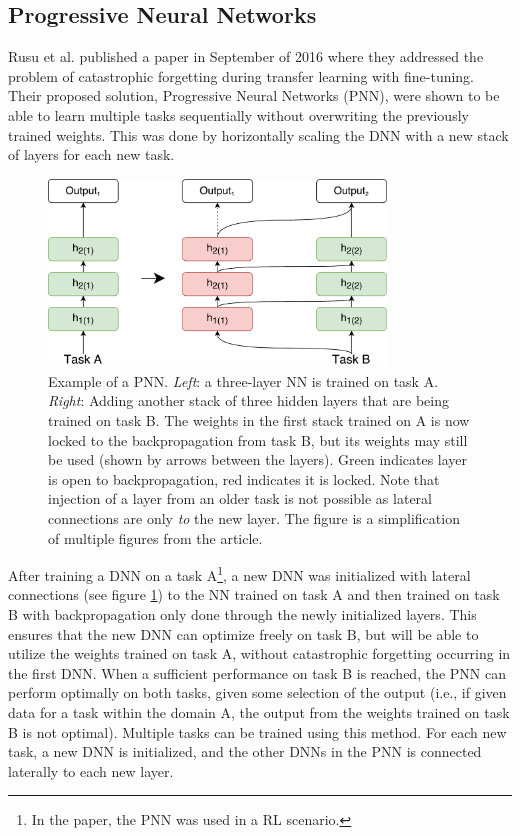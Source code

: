 \subsection{Progressive Neural Networks}
Rusu et al. published a paper in September of 2016\cite{progressiveneuralnetworks} where they addressed the problem of catastrophic forgetting during transfer learning with fine-tuning. Their proposed solution, Progressive Neural Networks (PNN), were shown to be able to learn multiple tasks sequentially without overwriting the previously trained weights. This was done by horizontally scaling the DNN with a new stack of layers for each new task.
\begin{figure}[ht]
    \centering
    \includegraphics[width=0.8\textwidth]{Chapters/2.Background/figures/ProgressiveNeuralNet.pdf}
    \caption[Progressive Neural Network]{Example of a PNN. \textit{Left}: a three-layer NN is trained on task A. \textit{Right}: Adding another stack of three hidden layers that are being trained on task B. The weights in the first stack trained on A is now locked to the backpropagation from task B, but its weights may still be used (shown by arrows between the layers). Green indicates layer is open to backpropagation, red indicates it is locked. Note that injection of a layer from an older task is not possible as lateral connections are only \textit{to} the new layer. The figure is a simplification of multiple figures from the article\cite{progressiveneuralnetworks}.}
    \label{fig:pnn}
\end{figure}
After training a DNN on a task A\footnote{In the paper, the PNN was used in a RL scenario.}, a new DNN was initialized with lateral connections (see figure \ref{fig:pnn}) to the NN trained on task A and then trained on task B with backpropagation only done through the newly initialized layers. This ensures that the new DNN can optimize freely on task B, but will be able to utilize the weights trained on task A, without catastrophic forgetting occurring in the first DNN. When a sufficient performance on task B is reached, the PNN can perform optimally on both tasks, given some selection of the output (i.e., if given data for a task within the domain A, the output from the weights trained on task B is not optimal). Multiple tasks can be trained using this method. For each new task, a new DNN is initialized, and the other DNNs in the PNN is connected laterally to each new layer. 

